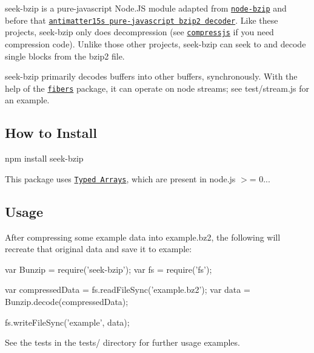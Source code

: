 \href{https://travis-ci.org/cscott/seek-bzip}{\tt } \href{https://david-dm.org/cscott/seek-bzip}{\tt } \href{https://david-dm.org/cscott/seek-bzip#info=devDependencies}{\tt }

{\ttfamily seek-\/bzip} is a pure-\/javascript Node.\+JS module adapted from \href{https://github.com/skeggse/node-bzip}{\tt node-\/bzip} and before that \href{https://github.com/antimatter15/bzip2.js}{\tt antimatter15\textquotesingle{}s pure-\/javascript bzip2 decoder}. Like these projects, {\ttfamily seek-\/bzip} only does decompression (see \href{https://github.com/cscott/compressjs}{\tt compressjs} if you need compression code). Unlike those other projects, {\ttfamily seek-\/bzip} can seek to and decode single blocks from the bzip2 file.

{\ttfamily seek-\/bzip} primarily decodes buffers into other buffers, synchronously. With the help of the \href{https://github.com/laverdet/node-fibers}{\tt fibers} package, it can operate on node streams; see {\ttfamily test/stream.\+js} for an example.

\subsection*{How to Install}


\begin{DoxyCode}
npm install seek-bzip
\end{DoxyCode}


This package uses \href{https://developer.mozilla.org/en-US/docs/JavaScript/Typed_arrays}{\tt Typed Arrays}, which are present in node.\+js $>$= 0...

\subsection*{Usage}

After compressing some example data into {\ttfamily example.\+bz2}, the following will recreate that original data and save it to {\ttfamily example}\+:


\begin{DoxyCode}
var Bunzip = require('seek-bzip');
var fs = require('fs');

var compressedData = fs.readFileSync('example.bz2');
var data = Bunzip.decode(compressedData);

fs.writeFileSync('example', data);
\end{DoxyCode}


See the tests in the {\ttfamily tests/} directory for further usage examples.

